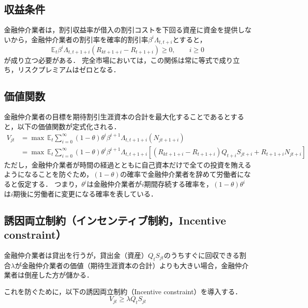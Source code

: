 \documentclass[dvipdfmx]{jlreq}
\begin{document}
\subsection*{収益条件}
金融仲介業者は，割引収益率が借入の割引コストを下回る資産に資金を提供しないから，金融仲介業者の割引率を確率的割引率$\beta^i \Lambda_{t,t+i}$とすると，
\begin{equation}
  \mathbb{E}_t \beta^i \Lambda_{t,t+1+i} (R_{kt+1+i} - R_{t+1+i}) \geq 0, \qquad i \geq 0
\end{equation}
が成り立つ必要がある．
完全市場においては，この関係は常に等式で成り立ち，リスクプレミアムはゼロとなる．

\subsection*{価値関数} \label{kati_kansuu}
金融仲介業者の目標を期待割引生涯資本の合計を最大化することであるとすると，以下の価値関数が定式化される．
\begin{align}
  V_{jt} &= \max \, \mathbb{E}_t \sum_{i=0}^{\infty} (1-\theta) \theta^i \beta^{i+1} \Lambda_{t,t+1+i} (N_{jt+1+i}) \\
  &= \max \, \mathbb{E}_t \sum_{i=0}^{\infty} (1-\theta) \theta^i \beta^{i+1} \Lambda_{t,t+1+i} [(R_{kt+1+i} - R_{t+1+i}) Q_{t+i} S_{jt+i} + R_{t+1+i} N_{jt+i}]
\end{align}
ただし，金融仲介業者が時間の経過とともに自己資本だけで全ての投資を賄えるようになることを防ぐため，$(1 - \theta)$の確率で金融仲介業者を辞めて労働者になると仮定する．
つまり，$\theta^i$は金融仲介業者が$i$期間存続する確率を，$(1-\theta) \theta^i$は$i$期後に労働者に変更になる確率を表している．

\subsection*{誘因両立制約（インセンティブ制約，Incentive constraint）}
金融仲介業者は貸出を行うが，貸出金（資産）$Q_t S_{jt}$のうちすぐに回収できる割合$\lambda$が金融仲介業者の価値（期待生涯資本の合計）よりも大きい場合，金融仲介業者は倒産した方が儲かる．

これを防ぐために，以下の誘因両立制約（Incentive constraint）を導入する．
\begin{equation}
  V_{jt} \geq \lambda Q_t S_{jt} \label{eq:9}
\end{equation}
\end{document}

